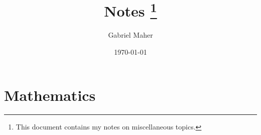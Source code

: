 \documentclass[12pt,a4paper]{book}
\title{
	{\LARGE \bfseries Notes}
	\thanks{This document contains my notes on miscellaneous topics.}
}
\author{
Gabriel Maher \\
}
\date{
	\today
}
\begin{document}
\maketitle

%

\part{Mathematics}





\end{document}
